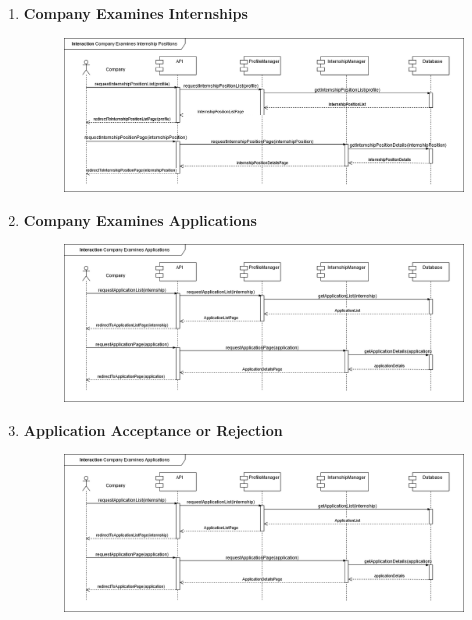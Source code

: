 \begin{enumerate}
    \newpage
    \item \textbf{Company Examines Internships}
    \begin{figure}[h!]
            \centering  \includegraphics[width=1\textwidth]{DD/Images/Interactions/INT12_CompanyExaminesInternships.drawio.png}
            \label{fig:ComponentViewDiagram}
    \end{figure}

    \newpage
    \item \textbf{Company Examines Applications}
    \begin{figure}[h!]
            \centering  \includegraphics[width=1\textwidth]{DD/Images/Interactions/INT13_CompanyExaminesApplications.drawio.png}
            \label{fig:ComponentViewDiagram}
    \end{figure}

    \newpage
    \item \textbf{Application Acceptance or Rejection}
    \begin{figure}[h!]
            \centering  \includegraphics[width=1\textwidth]{DD/Images/Interactions/INT13_CompanyExaminesApplications.drawio.png}
            \label{fig:ComponentViewDiagram}
    \end{figure}

    
\end{enumerate}
\newpage
